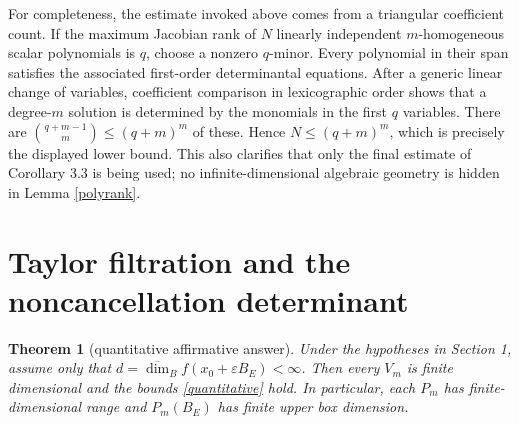 \documentclass[11pt]{article}
\newtheorem{theorem}{Theorem}
\newcommand{\udim}{\overline{\dim}_{B}}
\begin{document}
For completeness, the estimate invoked above comes from a triangular
coefficient count.  If the maximum Jacobian rank of $N$ linearly independent
$m$-homogeneous scalar polynomials is $q$, choose a nonzero $q$-minor.  Every
polynomial in their span satisfies the associated first-order determinantal
equations.  After a generic linear change of variables, coefficient comparison
in lexicographic order shows that a degree-$m$ solution is determined by the
monomials in the first $q$ variables.  There are
$\binom{q+m-1}{m}\le(q+m)^m$ of these.  Hence
$N\le(q+m)^m$, which is precisely the displayed lower bound.  This also
clarifies that only the final estimate of Corollary 3.3 is being used; no
infinite-dimensional algebraic geometry is hidden in Lemma \ref{polyrank}.

\section{Taylor filtration and the noncancellation determinant}

\begin{theorem}[quantitative affirmative answer]\label{main}
Under the hypotheses in Section 1, assume only that
$d=\udim f(x_0+\varepsilon B_E)<\infty$.  Then every $V_m$ is finite
dimensional and the bounds \eqref{quantitative} hold.  In particular,
each $P_m$ has finite-dimensional range and $P_m(B_E)$ has finite upper box
dimension.
\end{theorem}
\end{document}
